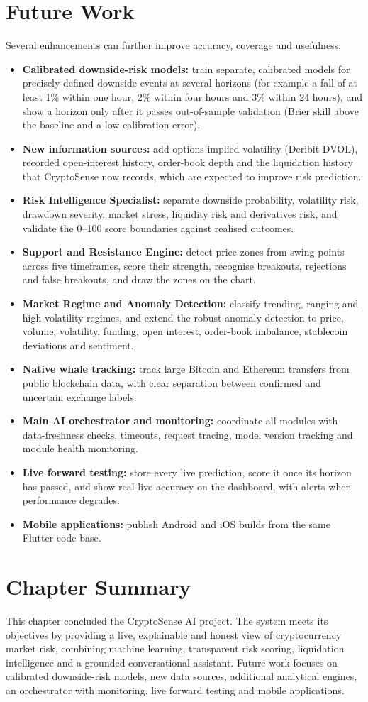 \section{Future Work}
Several enhancements can further improve accuracy, coverage and usefulness:
\begin{itemize}
\item \textbf{Calibrated downside-risk models:} train separate, calibrated models for precisely defined downside events at several horizons (for example a fall of at least 1\% within one hour, 2\% within four hours and 3\% within 24 hours), and show a horizon only after it passes out-of-sample validation (Brier skill above the baseline and a low calibration error).
\item \textbf{New information sources:} add options-implied volatility (Deribit DVOL), recorded open-interest history, order-book depth and the liquidation history that CryptoSense now records, which are expected to improve risk prediction.
\item \textbf{Risk Intelligence Specialist:} separate downside probability, volatility risk, drawdown severity, market stress, liquidity risk and derivatives risk, and validate the 0--100 score boundaries against realised outcomes.
\item \textbf{Support and Resistance Engine:} detect price zones from swing points across five timeframes, score their strength, recognise breakouts, rejections and false breakouts, and draw the zones on the chart.
\item \textbf{Market Regime and Anomaly Detection:} classify trending, ranging and high-volatility regimes, and extend the robust anomaly detection to price, volume, volatility, funding, open interest, order-book imbalance, stablecoin deviations and sentiment.
\item \textbf{Native whale tracking:} track large Bitcoin and Ethereum transfers from public blockchain data, with clear separation between confirmed and uncertain exchange labels.
\item \textbf{Main AI orchestrator and monitoring:} coordinate all modules with data-freshness checks, timeouts, request tracing, model version tracking and module health monitoring.
\item \textbf{Live forward testing:} store every live prediction, score it once its horizon has passed, and show real live accuracy on the dashboard, with alerts when performance degrades.
\item \textbf{Mobile applications:} publish Android and iOS builds from the same Flutter code base.
\end{itemize}

\section{Chapter Summary}
This chapter concluded the CryptoSense AI project. The system meets its objectives by providing a live, explainable and honest view of cryptocurrency market risk, combining machine learning, transparent risk scoring, liquidation intelligence and a grounded conversational assistant. Future work focuses on calibrated downside-risk models, new data sources, additional analytical engines, an orchestrator with monitoring, live forward testing and mobile applications.
